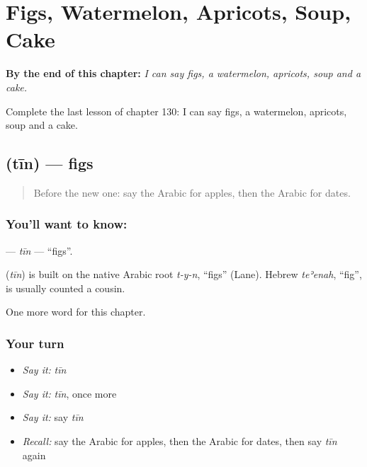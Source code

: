 
\chapter{Figs, Watermelon, Apricots, Soup, Cake}
\label{ch:ar-figs-watermelon-apricots-soup-cake}

\begin{chapteropening}
\textbf{By the end of this chapter:} \emph{I can say figs, a watermelon, apricots, soup and a cake.}

Complete the last lesson of chapter 130: I can say figs, a watermelon, apricots, soup and a cake.
\end{chapteropening}

\section[\texorpdfstring{\ar{تين} (tīn)}{تين (tīn)}]{ (tīn) — figs}

\label{lesson:AR-C130-tin}



\begin{quote}
Before the new one: say the Arabic for apples, then the Arabic for dates.
\end{quote}

\subsection*{You'll want to know: }
\textbf{} — \emph{tīn} — \textquotedblleft{}figs\textquotedblright{}.

\begin{cousinweb}
\textbf{} (\emph{tīn}) is built on the native Arabic root \emph{t-y-n}, \textquotedblleft{}figs\textquotedblright{} (Lane). Hebrew \emph{teʾenah}, \textquotedblleft{}fig\textquotedblright{}, is usually counted a cousin.
\end{cousinweb}

\begin{grammarlens}[title={What you've built}]
One more word for this chapter.
\end{grammarlens}

\subsection*{Your turn}
\begin{itemize}
\raggedright
  \item \emph{Say it:} \emph{tīn}
  \item \emph{Say it:} \emph{tīn}, once more
  \item \emph{Say it:} say \emph{tīn}
  \item \emph{Recall:} say the Arabic for apples, then the Arabic for dates, then say \emph{tīn} again
\end{itemize}

